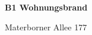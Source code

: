 \documentclass[parskip=half,12pt,DIV=15]{scrartcl}
\begin{document}

\begin{minipage}[t]{.75\textwidth}
\Huge
\textbf{B1 Wohnungsbrand}

Materborner Allee 177
\end{minipage}
\hfill
\begin{minipage}[t]{.15\textwidth}
    \hfill
\end{minipage}

\end{document}
